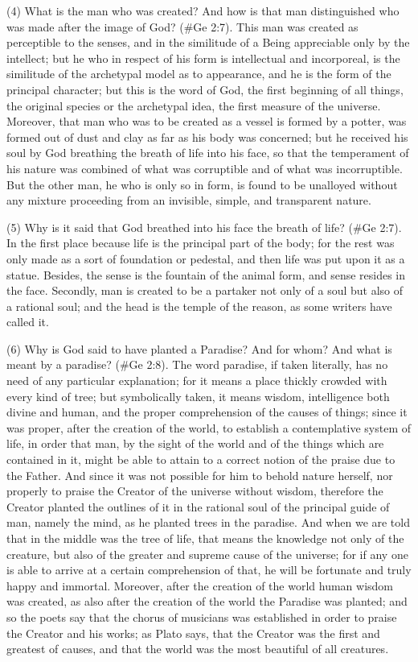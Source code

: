 (4) What is the man who was created? And how is that man distinguished who was made after the
image of God? (\#Ge 2:7). This man was created as perceptible to the senses, and in the
similitude of a Being appreciable only by the intellect; but he who in respect of his form is
intellectual and incorporeal, is the similitude of the archetypal model as to appearance, and he is
the form of the principal character; but this is the word of God, the first beginning of all things, the
original species or the archetypal idea, the first measure of the universe. Moreover, that man who
was to be created as a vessel is formed by a potter, was formed out of dust and clay as far as his
body was concerned; but he received his soul by God breathing the breath of life into his face, so
that the temperament of his nature was combined of what was corruptible and of what was
incorruptible. But the other man, he who is only so in form, is found to be unalloyed without any
mixture proceeding from an invisible, simple, and transparent nature.

(5) Why is it said that God breathed into his face the breath of life? (\#Ge 2:7). In the first place
because life is the principal part of the body; for the rest was only made as a sort of foundation or
pedestal, and then life was put upon it as a statue. Besides, the sense is the fountain of the animal
form, and sense resides in the face. Secondly, man is created to be a partaker not only of a soul
but also of a rational soul; and the head is the temple of the reason, as some writers have called it.

(6) Why is God said to have planted a Paradise? And for whom? And what is meant by a
paradise? (\#Ge 2:8). The word paradise, if taken literally, has no need of any particular
explanation; for it means a place thickly crowded with every kind of tree; but symbolically taken, it
means wisdom, intelligence both divine and human, and the proper comprehension of the causes
of things; since it was proper, after the creation of the world, to establish a contemplative system of
life, in order that man, by the sight of the world and of the things which are contained in it, might be
able to attain to a correct notion of the praise due to the Father. And since it was not possible for
him to behold nature herself, nor properly to praise the Creator of the universe without wisdom,
therefore the Creator planted the outlines of it in the rational soul of the principal guide of man,
namely the mind, as he planted trees in the paradise. And when we are told that in the middle was
the tree of life, that means the knowledge not only of the creature, but also of the greater and
supreme cause of the universe; for if any one is able to arrive at a certain comprehension of that,
he will be fortunate and truly happy and immortal. Moreover, after the creation of the world human
wisdom was created, as also after the creation of the world the Paradise was planted; and so the
poets say that the chorus of musicians was established in order to praise the Creator and his
works; as Plato says, that the Creator was the first and greatest of causes, and that the world was
the most beautiful of all creatures.

